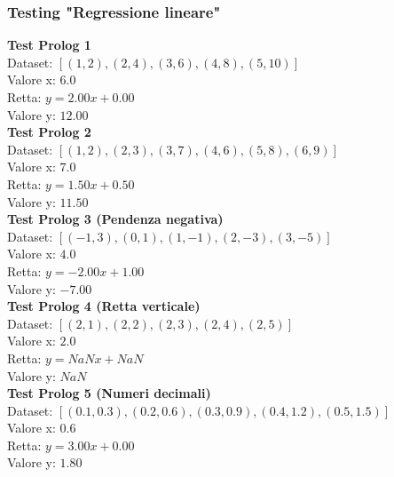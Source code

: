\documentclass[11pt]{article}
\theoremstyle{definition}
\begin{document}
\subsubsection{Testing "Regressione lineare"}
\noindent
\textbf{Test Prolog 1}\\
Dataset: $[(1, 2), (2, 4), (3, 6), (4, 8), (5, 10)]$\\
Valore x: $6.0$\\
Retta: $y = 2.00x + 0.00$\\
Valore y: $12.00$\\
\newline
\textbf{Test Prolog 2}\\
Dataset: $[(1, 2), (2, 3), (3, 7), (4, 6), (5, 8), (6, 9)]$\\
Valore x: $7.0$\\
Retta: $y = 1.50x + 0.50$\\
Valore y: $11.50$\\
\newline
\textbf{Test Prolog 3 (Pendenza negativa)}\\
Dataset: $[(-1, 3), (0, 1), (1, -1), (2, -3), (3, -5)]$\\
Valore x: $4.0$\\
Retta: $y = -2.00x + 1.00$\\
Valore y: $-7.00$\\
\newline
\textbf{Test Prolog 4 (Retta verticale)}\\
Dataset: $[(2, 1), (2, 2), (2, 3), (2, 4), (2, 5)]$\\
Valore x: $2.0$\\
Retta: $y = NaNx + NaN$\\
Valore y: $NaN$\\
\newline
\textbf{Test Prolog 5 (Numeri decimali)}\\
Dataset: $[(0.1, 0.3), (0.2, 0.6), (0.3, 0.9), (0.4, 1.2), (0.5, 1.5)]$\\
Valore x: $0.6$\\
Retta: $y = 3.00x + 0.00$\\
Valore y: $1.80$
\end{document}
